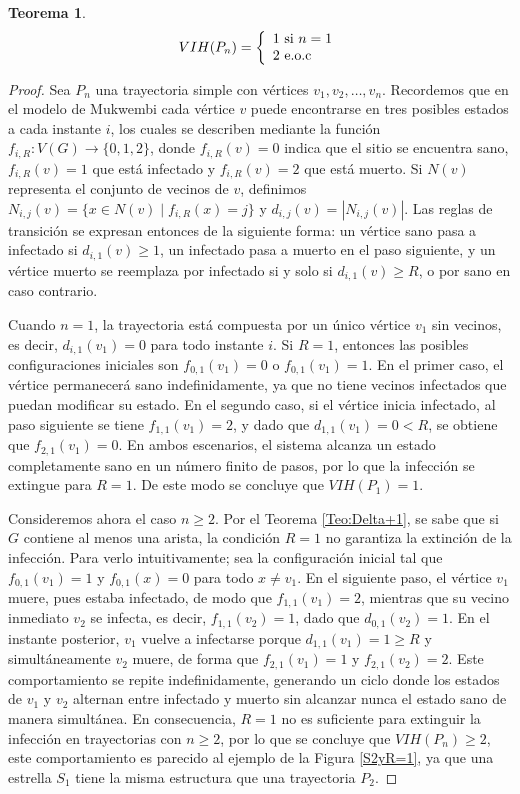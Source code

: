 \documentclass[12pt,titlepage,twoside,openright]{book}
\newtheorem{theorem}{Teorema}[section]
\begin{document}
\begin{theorem}\label{Teo:VIH(Pn)}
    $$
    VIH(P_n) = \left\lbrace
    \begin{array}{ll}
        1 \textup{ si } n = 1\\
        2 \textup{ e.o.c}
    \end{array}
    \right.
    $$
\end{theorem}

\begin{proof}
    Sea $P_n$ una trayectoria simple con v\'ertices $v_1,v_2,\dots,v_n$. Recordemos que en el modelo de Mukwembi cada v\'ertice $v$ puede encontrarse en tres posibles estados a cada instante $i$, los cuales se describen mediante la funci\'on $f_{i,R}:V(G)\rightarrow \{0,1,2\}$, donde $f_{i,R}(v)=0$ indica que el sitio se encuentra sano, $f_{i,R}(v)=1$ que est\'a infectado y $f_{i,R}(v)=2$ que est\'a muerto. Si $N(v)$ representa el conjunto de vecinos de $v$, definimos $N_{i,j}(v)=\{x\in N(v)\mid f_{i,R}(x)=j\}$ y $d_{i,j}(v)=|N_{i,j}(v)|$. Las reglas de transici\'on se expresan entonces de la siguiente forma: un v\'ertice sano pasa a infectado si $d_{i,1}(v)\ge 1$, un infectado pasa a muerto en el paso siguiente, y un v\'ertice muerto se reemplaza por infectado si y solo si $d_{i,1}(v)\ge R$, o por sano en caso contrario.

    Cuando $n=1$, la trayectoria est\'a compuesta por un \'unico v\'ertice $v_1$ sin vecinos, es decir, $d_{i,1}(v_1)=0$ para todo instante $i$. Si $R=1$, entonces las posibles configuraciones iniciales son $f_{0,1}(v_1)=0$ o $f_{0,1}(v_1)=1$. En el primer caso, el v\'ertice permanecer\'a sano indefinidamente, ya que no tiene vecinos infectados que puedan modificar su estado. En el segundo caso, si el v\'ertice inicia infectado, al paso siguiente se tiene $f_{1,1}(v_1)=2$, y dado que $d_{1,1}(v_1)=0<R$, se obtiene que $f_{2,1}(v_1)=0$. En ambos escenarios, el sistema alcanza un estado completamente sano en un n\'umero finito de pasos, por lo que la infecci\'on se extingue para $R=1$. De este modo se concluye que $VIH(P_1)=1$.

    Consideremos ahora el caso $n\ge 2$. Por el Teorema \ref{Teo:Delta+1}, se sabe que si $G$ contiene al menos una arista, la condici\'on $R=1$ no garantiza la extinci\'on de la infecci\'on. Para verlo intuitivamente; sea la configuraci\'on inicial tal que $f_{0,1}(v_1)=1$ y $f_{0,1}(x)=0$ para todo $x\neq v_1$. En el siguiente paso, el v\'ertice $v_1$ muere, pues estaba infectado, de modo que $f_{1,1}(v_1)=2$, mientras que su vecino inmediato $v_2$ se infecta, es decir, $f_{1,1}(v_2)=1$, dado que $d_{0,1}(v_2)=1$. En el instante posterior, $v_1$ vuelve a infectarse porque $d_{1,1}(v_1)=1\ge R$ y simult\'aneamente $v_2$ muere, de forma que $f_{2,1}(v_1)=1$ y $f_{2,1}(v_2)=2$. Este comportamiento se repite indefinidamente, generando un ciclo donde los estados de $v_1$ y $v_2$ alternan entre infectado y muerto sin alcanzar nunca el estado sano de manera simult\'anea. En consecuencia, $R=1$ no es suficiente para extinguir la infecci\'on en trayectorias con $n\ge 2$, por lo que se concluye que $VIH(P_n)\ge 2$, este comportamiento es parecido al ejemplo de la Figura \ref{S2yR=1}, ya que una estrella $S_1$ tiene la misma estructura que una trayectoria $P_2$.


\end{proof}
\end{document}
